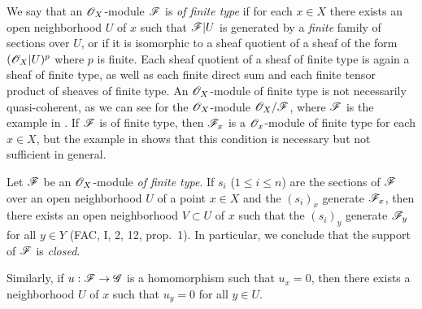 \begin{env}[5.2.1]
\label{0.5.2.1}
We say that an $\mathscr{O}_X$-module $\mathscr{F}$ is \emph{of finite type} if for each $x\in X$ there exists an open neighborhood $U$ of $x$ such that $\mathscr{F}|U$ is generated by a \emph{finite} family of sections over $U$, or if it is isomorphic to a sheaf quotient of a sheaf of the form $(\mathscr{O}_X|U)^p$ where $p$ is finite.
Each sheaf quotient of a sheaf of finite type is again a sheaf of finite type, as well as each finite direct sum and each finite tensor product of sheaves of finite type.
An $\mathscr{O}_X$-module of finite type is not necessarily quasi-coherent, as we can see for the $\mathscr{O}_X$-module $\mathscr{O}_X/\mathscr{F}$, where $\mathscr{F}$ is the example in .
If $\mathscr{F}$ is of finite type, then $\mathscr{F}_x$ is a $\mathscr{O}_x$-module of finite type for each $x\in X$, but the example in  shows that this condition is necessary but not sufficient in general.
\end{env}

\begin{env}[5.2.2]
\label{0.5.2.2}
Let $\mathscr{F}$ be an $\mathscr{O}_X$-module \emph{of finite type}.
If $s_i$ ($1\leq i\leq n$) are the sections of $\mathscr{F}$ over an open neighborhood $U$ of a point $x\in X$ and the $(s_i)_x$ generate $\mathscr{F}_x$, then there exists an open neighborhood $V\subset U$ of $x$ such that the $(s_i)_y$ generate $\mathscr{F}_y$ for all $y\in Y$ (FAC, I, 2, 12, prop.~1).
In particular, we conclude that the support of $\mathscr{F}$ is \emph{closed}.

Similarly, if $u:\sh{F}\to\sh{G}$ is a homomorphism such that $u_x=0$, then there exists a neighborhood $U$ of $x$ such that $u_y=0$ for all $y\in U$.
\end{env}

